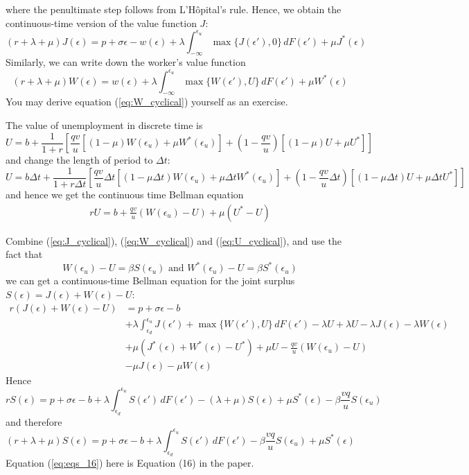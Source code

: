 \documentclass[12pt]{article}
\begin{document}
where the penultimate step follows from L'H\^opital's rule. Hence, we obtain the continuous-time version of the value function $J$:
\begin{equation} \label{eq:J_cyclical}
	(r + \lambda + \mu) J(\epsilon) = p + \sigma \epsilon - w(\epsilon) + \lambda \int_{-\infty}^{\epsilon_u} \max\{J(\epsilon'), 0\} \, dF(\epsilon') + \mu   J^*(\epsilon)  
\end{equation}
Similarly, we can write down the worker's value function
\begin{equation} \label{eq:W_cyclical}
	(r + \lambda + \mu) W(\epsilon) =  w(\epsilon) + \lambda \int_{-\infty}^{\epsilon_u} \max\{W(\epsilon'), U\} \, dF(\epsilon') + \mu  W^*(\epsilon) 
\end{equation}
You may derive equation (\ref{eq:W_cyclical}) yourself as an exercise.

The value of unemployment in discrete time is
\begin{equation}
	U = b + \frac{1}{1+r} \left[\frac{qv}{u}[(1-\mu) W(\epsilon_u) + \mu W^*(\epsilon_u)] + \left(1 - \frac{qv}{u}\right) [(1-\mu) U + \mu U^*]\right]
\end{equation}
and change the length of period to $\Delta t$:
\[U = b \Delta t + \frac{1}{1+r \Delta t} \left[\frac{qv}{u} \Delta t[(1-\mu \Delta t) W(\epsilon_u) + \mu \Delta t W^*(\epsilon_u)] + \left(1 - \frac{qv}{u} \Delta t\right) [(1-\mu \Delta t) U + \mu \Delta t U^*]\right]\]
and hence we get the continuous time Bellman equation
\begin{align} \label{eq:U_cyclical}
	r U  = b + \frac{q v}{u} (W(\epsilon_u)- U) + \mu (U^*-U) 
\end{align}


Combine (\ref{eq:J_cyclical}), (\ref{eq:W_cyclical}) and (\ref{eq:U_cyclical}), and use the fact that 
\[W(\epsilon_u) - U = \beta S(\epsilon_u) \text{ and } W^*(\epsilon_u) - U = \beta S^*(\epsilon_u)\]
we can get a continuous-time Bellman equation for the joint surplus $S(\epsilon) = J(\epsilon) + W(\epsilon) - U$:
\begin{align*}
	r (J(\epsilon) + W(\epsilon) - U) &= p + \sigma \epsilon - b  \\
	& + \lambda \int_{\epsilon_d}^{\epsilon_u} J(\epsilon') + \max\{W(\epsilon'), U\} \, d F(\epsilon') - \lambda U + \lambda U - \lambda J(\epsilon) - \lambda W(\epsilon)\\
	& + \mu (J^*(\epsilon) + W^*(\epsilon) - U^*) + \mu U  -  \frac{q v}{u} (W(\epsilon_u)- U)\\
	& - \mu J(\epsilon) - \mu W(\epsilon)
\end{align*}
Hence
\[r S(\epsilon) = p + \sigma \epsilon - b + \lambda \int_{\epsilon_d}^{\epsilon_u} S(\epsilon') \, d F(\epsilon') - (\lambda + \mu) S(\epsilon) + \mu S^*(\epsilon) - \beta\frac{vq}{u} S(\epsilon_u)\]
and therefore 
\begin{equation} \label{eq:eqs_16}
	(r + \lambda + \mu) S(\epsilon) = p + \sigma \epsilon - b  +  \lambda \int_{\epsilon_d}^{\epsilon_u} S(\epsilon') \, d F(\epsilon')- \beta\frac{vq}{u} S(\epsilon_u)+ \mu S^*(\epsilon)
\end{equation}
Equation (\ref{eq:eqs_16}) here is Equation (16) in the paper. 
\end{document}

